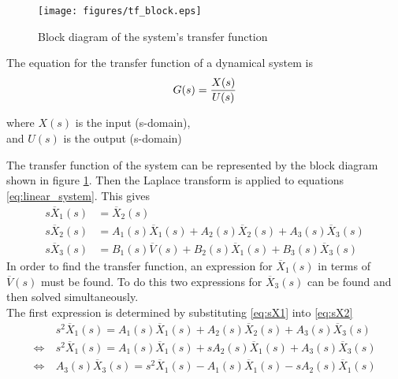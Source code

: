 \documentclass[a4paper,10pt,reqno]{amsart}
\numberwithin{equation}{section}
\begin{document}
\begin{figure}[H]
     \texttt{[image: figures/tf\_block.eps]}
     \caption{Block diagram of the system's transfer function}
     \label{fig:tfBlock}
\end{figure}
The equation for the transfer function of a dynamical system is
\begin{equation}
     G(s) = \frac{X(s)}{U(s)} \label{eq:TF} \\
\end{equation}
\begin{center}
     where $X(s)$ is the input (s-domain), \\
     and $U(s)$ is the output (s-domain)
\end{center}
\vspace{10pt}
The transfer function of the system can be represented by the block diagram shown in figure \ref{fig:tfBlock}.
Then the Laplace transform is applied to equations \eqref{eq:linear_system}. This gives
\begin{subequations} \label{eq:SysLT}
    \begin{align}
         s\overline{X}_1(s) &= \overline{X}_2(s) \label{eq:sX1} \\
         s\overline{X}_2(s) &= A_1(s)\overline{X}_1(s) + A_2(s)\overline{X}_2(s) + A_3(s)\overline{X}_3(s) \label{eq:sX2} \\
         s\overline{X}_3(s) &= B_1(s)\overline{V}(s) + B_2(s)\overline{X}_1(s) + B_3(s)\overline{X}_3(s) \label{eq:sX4}
    \end{align}
\end{subequations}
\vspace{1pt}
In order to find the transfer function, an expression for $\overline{X}_1(s)$ in terms of $\overline{V}(s)$ must be found. To do this two expressions for $\overline{X}_3(s)$ can be found and then solved simultaneously.\\
The first expression is determined by substituting \eqref{eq:sX1} into \eqref{eq:sX2}
\begin{align*}
     &~ s^2\overline{X}_1(s) = A_1(s)\overline{X}_1(s) + A_2(s)\overline{X}_2(s) + A_3(s)\overline{X}_3(s) \\
     \Leftrightarrow&~ s^2\overline{X}_1(s) = A_1(s)\overline{X}_1(s) + sA_2(s)\overline{X}_1(s) + A_3(s)\overline{X}_3(s) \\
     \Leftrightarrow&~ A_3(s)\overline{X}_3(s) = s^2\overline{X}_1(s) - A_1(s)\overline{X}_1(s) - sA_2(s)\overline{X}_1(s)
\end{align*}
\end{document}
